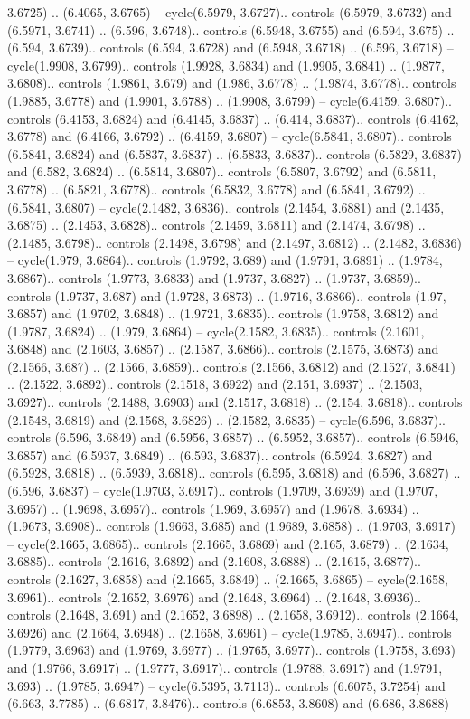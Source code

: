 3.6725) .. (6.4065, 3.6765) -- cycle(6.5979, 3.6727).. controls (6.5979, 3.6732) and (6.5971, 3.6741) .. (6.596, 3.6748).. controls (6.5948, 3.6755) and (6.594, 3.675) .. (6.594, 3.6739).. controls (6.594, 3.6728) and (6.5948, 3.6718) .. (6.596, 3.6718) -- cycle(1.9908, 3.6799).. controls (1.9928, 3.6834) and (1.9905, 3.6841) .. (1.9877, 3.6808).. controls (1.9861, 3.679) and (1.986, 3.6778) .. (1.9874, 3.6778).. controls (1.9885, 3.6778) and (1.9901, 3.6788) .. (1.9908, 3.6799) -- cycle(6.4159, 3.6807).. controls (6.4153, 3.6824) and (6.4145, 3.6837) .. (6.414, 3.6837).. controls (6.4162, 3.6778) and (6.4166, 3.6792) .. (6.4159, 3.6807) -- cycle(6.5841, 3.6807).. controls (6.5841, 3.6824) and (6.5837, 3.6837) .. (6.5833, 3.6837).. controls (6.5829, 3.6837) and (6.582, 3.6824) .. (6.5814, 3.6807).. controls (6.5807, 3.6792) and (6.5811, 3.6778) .. (6.5821, 3.6778).. controls (6.5832, 3.6778) and (6.5841, 3.6792) .. (6.5841, 3.6807) -- cycle(2.1482, 3.6836).. controls (2.1454, 3.6881) and (2.1435, 3.6875) .. (2.1453, 3.6828).. controls (2.1459, 3.6811) and (2.1474, 3.6798) .. (2.1485, 3.6798).. controls (2.1498, 3.6798) and (2.1497, 3.6812) .. (2.1482, 3.6836) -- cycle(1.979, 3.6864).. controls (1.9792, 3.689) and (1.9791, 3.6891) .. (1.9784, 3.6867).. controls (1.9773, 3.6833) and (1.9737, 3.6827) .. (1.9737, 3.6859).. controls (1.9737, 3.687) and (1.9728, 3.6873) .. (1.9716, 3.6866).. controls (1.97, 3.6857) and (1.9702, 3.6848) .. (1.9721, 3.6835).. controls (1.9758, 3.6812) and (1.9787, 3.6824) .. (1.979, 3.6864) -- cycle(2.1582, 3.6835).. controls (2.1601, 3.6848) and (2.1603, 3.6857) .. (2.1587, 3.6866).. controls (2.1575, 3.6873) and (2.1566, 3.687) .. (2.1566, 3.6859).. controls (2.1566, 3.6812) and (2.1527, 3.6841) .. (2.1522, 3.6892).. controls (2.1518, 3.6922) and (2.151, 3.6937) .. (2.1503, 3.6927).. controls (2.1488, 3.6903) and (2.1517, 3.6818) .. (2.154, 3.6818).. controls (2.1548, 3.6819) and (2.1568, 3.6826) .. (2.1582, 3.6835) -- cycle(6.596, 3.6837).. controls (6.596, 3.6849) and (6.5956, 3.6857) .. (6.5952, 3.6857).. controls (6.5946, 3.6857) and (6.5937, 3.6849) .. (6.593, 3.6837).. controls (6.5924, 3.6827) and (6.5928, 3.6818) .. (6.5939, 3.6818).. controls (6.595, 3.6818) and (6.596, 3.6827) .. (6.596, 3.6837) -- cycle(1.9703, 3.6917).. controls (1.9709, 3.6939) and (1.9707, 3.6957) .. (1.9698, 3.6957).. controls (1.969, 3.6957) and (1.9678, 3.6934) .. (1.9673, 3.6908).. controls (1.9663, 3.685) and (1.9689, 3.6858) .. (1.9703, 3.6917) -- cycle(2.1665, 3.6865).. controls (2.1665, 3.6869) and (2.165, 3.6879) .. (2.1634, 3.6885).. controls (2.1616, 3.6892) and (2.1608, 3.6888) .. (2.1615, 3.6877).. controls (2.1627, 3.6858) and (2.1665, 3.6849) .. (2.1665, 3.6865) -- cycle(2.1658, 3.6961).. controls (2.1652, 3.6976) and (2.1648, 3.6964) .. (2.1648, 3.6936).. controls (2.1648, 3.691) and (2.1652, 3.6898) .. (2.1658, 3.6912).. controls (2.1664, 3.6926) and (2.1664, 3.6948) .. (2.1658, 3.6961) -- cycle(1.9785, 3.6947).. controls (1.9779, 3.6963) and (1.9769, 3.6977) .. (1.9765, 3.6977).. controls (1.9758, 3.693) and (1.9766, 3.6917) .. (1.9777, 3.6917).. controls (1.9788, 3.6917) and (1.9791, 3.693) .. (1.9785, 3.6947) -- cycle(6.5395, 3.7113).. controls (6.6075, 3.7254) and (6.663, 3.7785) .. (6.6817, 3.8476).. controls (6.6853, 3.8608) and (6.686, 3.8688) 